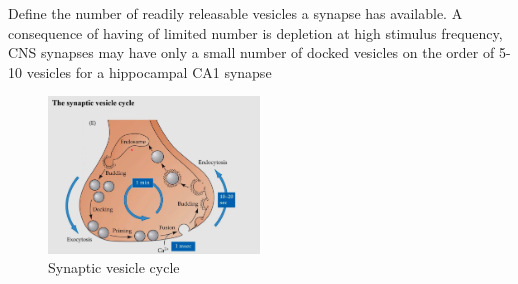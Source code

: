 \documentclass{article}
\begin{document}
Define the number of readily releasable vesicles a synapse has available. A consequence of having of limited number is depletion at high stimulus frequency, CNS synapses may have only a small number of docked vesicles on the order of 5-10 vesicles for a hippocampal CA1 synapse

\begin{figure}[h]
\centering
\includegraphics[width=0.5\textwidth]{assets/synaptic-vesicle-cycle.png}
\caption{Synaptic vesicle cycle}
\end{figure}
\end{document}
